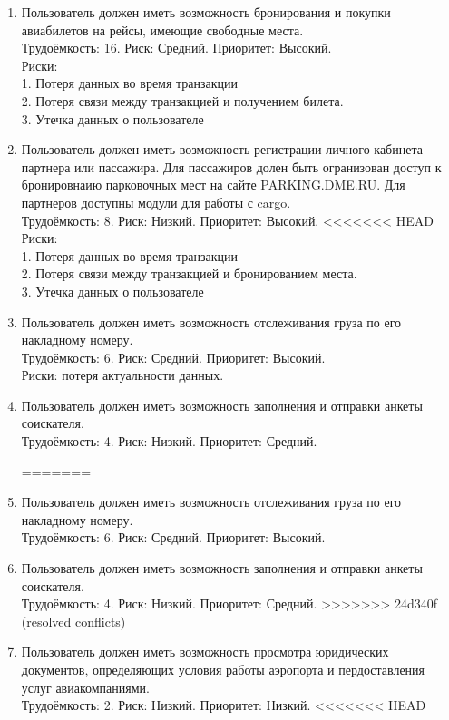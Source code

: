 \begin{enumerate}
    \item Пользователь должен иметь возможность бронирования и 
          покупки авиабилетов на рейсы, имеющие свободные места. \\
          Трудоёмкость: 16. Риск: Средний. Приоритет: Высокий. \\
          Риски: \\
          1. Потеря данных во время транзакции \\
          2. Потеря связи между транзакцией и получением билета.\\
          3. Утечка данных о пользователе

    \item Пользователь должен иметь возможность регистрации личного 
          кабинета партнера или пассажира. Для пассажиров долен быть 
          огранизован доступ к бронировнаию парковочных мест на сайте 
          PARKING.DME.RU. Для партнеров доступны модули для работы с cargo. \\
          Трудоёмкость: 8. Риск: Низкий. Приоритет: Высокий.
<<<<<<< HEAD
          Риски: \\
          1. Потеря данных во время транзакции \\
          2. Потеря связи между транзакцией и бронированием места. \\
          3. Утечка данных о пользователе
          
    \item Пользователь должен иметь возможность отслеживания груза 
          по его накладному номеру. \\
          Трудоёмкость: 6. Риск: Средний. Приоритет: Высокий. \\
          Риски: потеря актуальности данных.

    \item Пользователь должен иметь возможность заполнения и отправки 
          анкеты соискателя. \\
          Трудоёмкость: 4. Риск: Низкий. Приоритет: Средний.

=======
    \item Пользователь должен иметь возможность отслеживания груза 
          по его накладному номеру. \\
          Трудоёмкость: 6. Риск: Средний. Приоритет: Высокий.
    \item Пользователь должен иметь возможность заполнения и отправки 
          анкеты соискателя. \\
          Трудоёмкость: 4. Риск: Низкий. Приоритет: Средний.
>>>>>>> 24d340f (resolved conflicts)
    \item Пользователь должен иметь возможность просмотра юридических 
          документов, определяющих условия работы аэропорта и пердоставления 
          услуг авиакомпаниями. \\
          Трудоёмкость: 2. Риск: Низкий. Приоритет: Низкий.
<<<<<<< HEAD


\end{enumerate}
